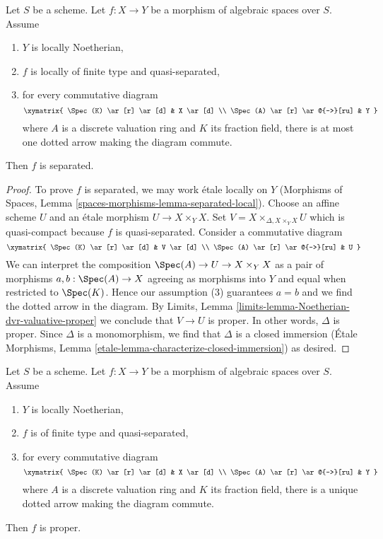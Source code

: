 \begin{lemma}
\label{lemma-check-separated-dvr}
Let $S$ be a scheme. Let $f : X \to Y$ be a morphism of algebraic
spaces over $S$. Assume
\begin{enumerate}
\item $Y$ is locally Noetherian,
\item $f$ is locally of finite type and quasi-separated,
\item for every commutative diagram
$$
\xymatrix{
\Spec(K) \ar[r] \ar[d] & X \ar[d] \\
\Spec(A) \ar[r] \ar@{-->}[ru] & Y
}
$$
where $A$ is a discrete valuation ring and $K$ its fraction field,
there is at most one dotted arrow making the diagram commute.
\end{enumerate}
Then $f$ is separated.
\end{lemma}

\begin{proof}
To prove $f$ is separated, we may work \'etale locally on $Y$
(Morphisms of Spaces, Lemma \ref{spaces-morphisms-lemma-separated-local}).
Choose an affine scheme $U$ and an \'etale morphism $U \to X \times_Y X$.
Set $V = X \times_{\Delta, X \times_Y X} U$ which is quasi-compact because
$f$ is quasi-separated. Consider a commutative diagram
$$
\xymatrix{
\Spec(K) \ar[r] \ar[d] & V \ar[d] \\
\Spec(A) \ar[r] \ar@{-->}[ru] & U
}
$$
We can interpret the composition $\Spec(A) \to U \to X \times_Y X$
as a pair of morphisms $a, b : \Spec(A) \to X$ agreeing as morphisms
into $Y$ and equal when restricted to $\Spec(K)$. Hence our assumption
(3) guarantees $a = b$ and we find the dotted arrow in the diagram.
By Limits, Lemma \ref{limits-lemma-Noetherian-dvr-valuative-proper}
we conclude that $V \to U$ is proper. In other words, $\Delta$ is proper.
Since $\Delta$ is a monomorphism, we find that $\Delta$ is a
closed immersion (\'Etale Morphisms, Lemma
\ref{etale-lemma-characterize-closed-immersion}) as desired.
\end{proof}

\begin{lemma}
\label{lemma-check-proper-dvr}
Let $S$ be a scheme. Let $f : X \to Y$ be a morphism of algebraic
spaces over $S$. Assume
\begin{enumerate}
\item $Y$ is locally Noetherian,
\item $f$ is of finite type and quasi-separated,
\item for every commutative diagram
$$
\xymatrix{
\Spec(K) \ar[r] \ar[d] & X \ar[d] \\
\Spec(A) \ar[r] \ar@{-->}[ru] & Y
}
$$
where $A$ is a discrete valuation ring and $K$ its fraction field,
there is a unique dotted arrow making the diagram commute.
\end{enumerate}
Then $f$ is proper.
\end{lemma}

